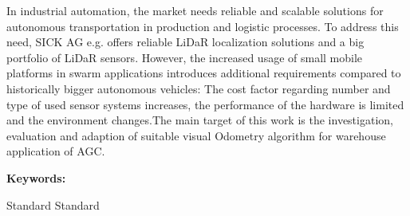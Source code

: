 \noindent
\normalsize
In industrial automation, the market needs reliable and scalable solutions for autonomous transportation in production and logistic processes. To address this need, SICK AG e.g. offers reliable LiDaR localization solutions and a big portfolio of LiDaR sensors. However, the increased usage of small mobile platforms in swarm applications introduces additional requirements compared to historically bigger autonomous vehicles: The cost factor regarding number and type of used sensor systems increases, the performance of the hardware is limited
and the environment changes.The main target of this work is the investigation, evaluation and adaption of suitable visual Odometry algorithm for warehouse application of AGC.
 
\vspace{16pt}
\noindent\huge\textbf{Keywords:}
 
\vspace{16pt}
\normalsize
\noindent
    Standard Standard 